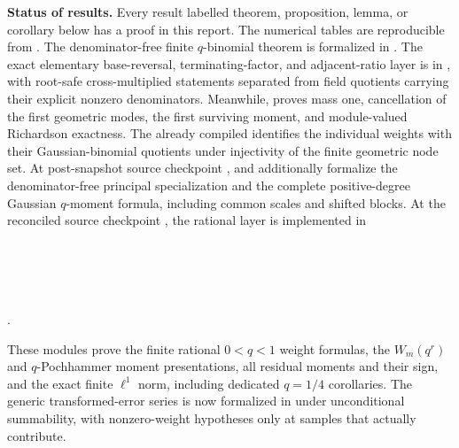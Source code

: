 \documentclass[11pt,oneside]{article}
\numberwithin{equation}{section}
\theoremstyle{definition}
\theoremstyle{remark}
\begin{document}
\medskip
\noindent\textbf{Status of results.}
Every result labelled theorem, proposition, lemma, or corollary below has a proof
in this report. The numerical tables are reproducible from
.  The denominator-free finite
\(q\)-binomial theorem is formalized in .
The exact elementary base-reversal, terminating-factor, and adjacent-ratio
layer is in , with root-safe
cross-multiplied statements separated from field quotients carrying their
explicit nonzero denominators.  Meanwhile,
 proves mass one, cancellation of the first
geometric modes, the first surviving moment, and module-valued Richardson
exactness.  The already compiled 
identifies the individual weights with their Gaussian-binomial quotients under
injectivity of the finite geometric node set.  At post-snapshot source
checkpoint ,
 and
 additionally formalize the
denominator-free principal specialization and the complete positive-degree
Gaussian \(q\)-moment formula, including common scales and shifted blocks.
At the reconciled source checkpoint
,
the rational layer is implemented in
\begin{center}
\\
\\
\\
\\
.
\end{center}
These modules prove the finite rational
\(0<q<1\) weight formulas, the \(W_m(q^r)\) and \(q\)-Pochhammer moment
presentations, all residual moments and their sign, and the exact finite
\(\ell^1\) norm, including dedicated \(q=1/4\) corollaries.  The
generic transformed-error series is now formalized in
 under unconditional summability, with
nonzero-weight hypotheses only at samples that actually contribute.
\end{document}
